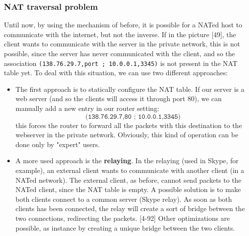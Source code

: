 \subsubsection{NAT traversal problem}
Until now, by using the mechanism of before, it is possible for a NATed host to communicate with the internet, but not the inverse. If in the picture [49], the client wants to communicate with the server in the private network, this is not possible, since the server has never communicated with the client, and so the association \texttt{(138.76.29.7,port ; 10.0.0.1,3345)} is not present in the NAT table yet. To deal with this situation, we can use two different approaches:
\begin{itemize}
    \item The first approach is to statically configure the NAT table. If our server is a web server (and so the clients will access it through port 80), we can manually add a new entry in our router setting:
    \[\texttt{(138.76.29.7,80 ; 10.0.0.1,3345)}\]
    this forces the router to forward all the packets with this destination to the webserver in the private network. Obviously, this kind of operation can be done only by "expert" users.
    \item A more used approach is the \textbf{relaying}. In the relaying (used in Skype, for example), an external client wants to communicate with another client (in a NATed network). The external client, as before, cannot send packets to the NATed client, since the NAT table is empty. A possible solution is to make both clients connect to a common server (Skype relay). As soon as both clients has been connected, the relay will create a sort of bridge between the two connections, redirecting the packets. [4-92] Other optimizations are possible, as instance by creating a unique bridge between the two clients.
\end{itemize}

